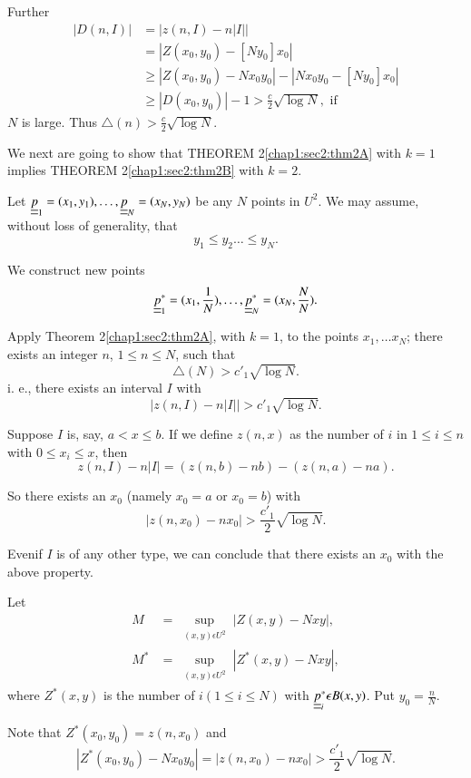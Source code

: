 Further\pageoriginale
\begin{align*}
|D(n, I)| & = |z(n, I) - n|I||\\
 & = |Z(x_{0}, y_{0}) - [Ny_{0}]x_{0}|\\
 & \geq |Z(x_{0}, y_{0}) - Nx_{0}y_{0}| - |Nx_{0}y_{0} - [Ny_{0}]x_{0}|\\
 & \geq |D(x_{0}, y_{0})| - 1 > \frac{c}{2} \sqrt{\log N},\text{ if }
\end{align*}
$N$ is large. Thus $\triangle(n) > \frac{c}{2} \sqrt{\log N}$.

We next are going  to show that
THEOREM 2\ref{chap1:sec2:thm2A} with $k = 1$ implies THEOREM 2\ref{chap1:sec2:thm2B} with $k = 2$.

Let $\underline{\underline{p}}_{1} = (x_{1}, y_{1}), \ldots ,\underline{\underline{p}}_{N} = (x_{N}, y_{N})$ be any $N$ points in $U^{2}$. We may assume, without loss of generality, that
$$
y_{1} \leq y_{2} \ldots \leq y_{N}.
$$

We construct new points
$$
\underline{\underline{p}}_{1}^{*} = (x_{1}, \frac{1}{N}), \ldots, \underline{\underline{p}}_{N}^{*} = (x_{N}, \frac{N}{N}).
$$

Apply Theorem 2\ref{chap1:sec2:thm2A}, with $k = 1$, to the points $x_{1}, \ldots x_{N}$; there exists an integer $n$, $1 \leq n \leq N$, such that
$$
\triangle(N) > c'_{1} \sqrt{\log N}.
$$
i. e., there exists an interval $I$ with
$$
|z(n, I) - n|I|| > c'_{1} \sqrt{\log N}.
$$

Suppose $I$ is, say, $a < x \leq b$. If we define $z(n, x)$ as the number of $i$ in $1 \leq i \leq n$ with $0 \leq x_{i} \leq x$, then
$$
z(n, I) - n |I| = (z(n, b) - nb) - (z(n, a) - na).
$$ 

So there exists an $x_{0}$ (namely $x_{0} = a$ or $x_{0} = b$) with
$$
|z(n, x_{0}) - nx_{0}| > \frac{c'_{1}}{2} \sqrt{\log N}.
$$

Even\pageoriginale if $I$ is of any other type, we can conclude that there exists an $x_{0}$ with the above property.

Let 
\begin{align*}
M & = \sup_{\substack{(x, y)\epsilon U^{2}}} |Z(x, y) -Nxy|,\\
M^{*} & = \sup_{\substack{(x, y) \epsilon U^{2}}} |Z^{*}(x, y) -Nxy|,
\end{align*}
where $Z^{*} (x, y)$ is the number of $i (1 \leq i \leq N)$ with $\underline{\underline{p}}_{i}^{*} \epsilon B(x, y)$. Put $y_{0} = \frac{n}{N}$.

Note that $Z^{*} (x_{0}, y_{0}) = z(n, x_{0})$ and
$$
|Z^{*} (x_{0}, y_{0}) - Nx_{0}y_{0}| = |z(n, x_{0}) - nx_{0}| > \frac{c'_{1}}{2} \sqrt{\log N}.
$$


